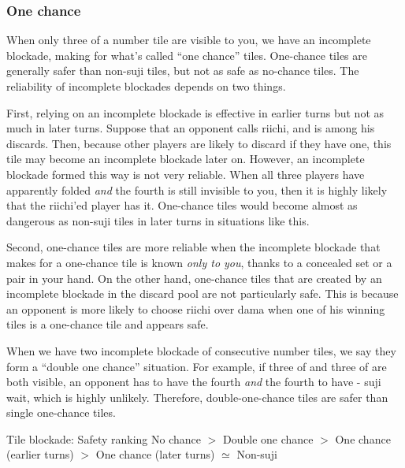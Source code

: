 {{\subsubsection*{One chance}

When only three of a number tile are visible to you, we have an incomplete blockade, making for what's called ``one chance'' tiles. One-chance tiles are generally safer than non-{\jap suji} tiles, but not as safe as no-chance tiles. 
The reliability of incomplete blockades depends on two things. 

\bigskip
First, relying on an incomplete blockade is effective in earlier turns but not as much in later turns. Suppose that an opponent calls riichi, and {\LARGE{}} is among his discards. Then, because other players are likely to discard {\LARGE{}} if they have one, this tile may become an incomplete blockade later on. However, an incomplete blockade formed this way is not very reliable. When all three players have apparently folded \emph{and} the fourth {\LARGE{}} is still invisible to you, then it is highly likely that the riichi'ed player has it. One-chance tiles would become almost as dangerous as non-{\jap suji} tiles in later turns in situations like this. 

\bigskip
Second, one-chance tiles are more reliable when the incomplete blockade that makes for a one-chance tile is known \emph{only to you}, thanks to a concealed set or a pair in your hand. On the other hand, one-chance tiles that are created by an incomplete blockade in the discard pool are not particularly safe. This is because an opponent is more likely to choose riichi over {\jap dama} when one of his winning tiles is a one-chance tile and appears safe.

\bigskip

When we have two incomplete blockade of consecutive number tiles, we say they form a ``double one chance'' situation. For example, if three of {\LARGE{}} and three of {\LARGE{}} are both visible, an opponent has to have the fourth {\LARGE{}} \emph{and} the fourth {\LARGE{}} to have {\LARGE{}-} {\jap suji} wait, which is highly unlikely. Therefore, double-one-chance tiles are safer than single one-chance tiles. 

\bigskip
\begin{itembox}[c]{Tile blockade: Safety ranking}
No chance $>$ Double one chance $>$ One chance (earlier turns) $>$ One chance (later turns) $\simeq$ Non-{\jap suji}
\vsps
\end{itembox}
\bigskip

}}
